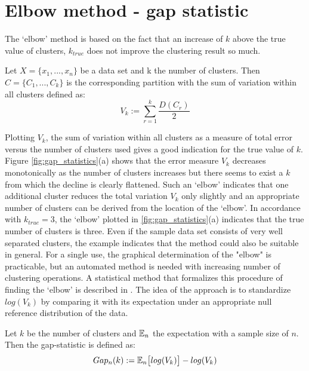 \clearpage %
\section{Elbow method - gap statistic}
The `elbow' method is  based on the fact that an increase of $k$ above the true value of clusters, $k_{true}$ does not improve the clustering result so much.

\begin{definition}
Let $X = \{x_1, ..., x_n\}$ be a data set and k the number of clusters. Then $C=\{C_1, ..., C_k\}$ is the corresponding partition with the sum of variation within all clusters defined as: 
	\begin{equation*}
		V_k := \sum_{r=1}^k \frac{D(C_r)}{2}
	\end{equation*}
\end{definition}

 Plotting $V_k$, the sum of variation within all clusters as a measure of total error versus the number of clusters used gives a good indication for the true value of $k$. Figure \ref{fig:gap_statistics}(a) shows that the error measure $V_k$ decreases monotonically as the number of clusters increases but there seems to exist a $k$ from which the decline is clearly flattened. Such an `elbow' indicates that one additional cluster reduces the total variation $V_k$ only slightly and an appropriate number of clusters can be derived from the location of the `elbow'. In accordance with $k_{true}=3$, the `elbow' plotted in \ref{fig:gap_statistics}(a) indicates that the true number of clusters is three. Even if the sample data set consists of very well separated clusters, the example indicates that the method could also be suitable in general. For a single use, the graphical determination of the "elbow" is practicable, but an automated method is needed with increasing number of clustering operations. A statistical method that formalizes this procedure of finding the `elbow' is described in \cite{tibshirani2001estimating}. The idea of the approach is to standardize $log(V_k)$ by comparing it with its expectation under an appropriate null reference distribution of the data. 
 
\begin{definition}
Let $k$ be the number of clusters and $\mathbb{E}_n$  the expectation with a sample size of $n$. Then the gap-statistic is defined as: 
	\begin{equation}\label{equ:gap_statistic}
		Gap_n(k) := \mathbb{E}_n\big[ log(V_k) \big] - log(V_k)
	\end{equation}
\end{definition}

